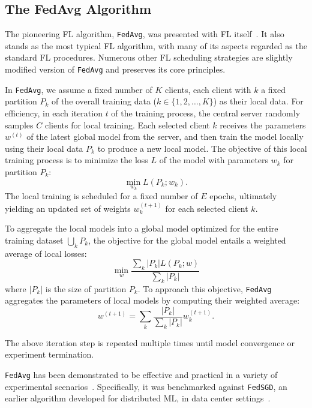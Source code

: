 \documentclass[conference]{IEEEtran}
\begin{document}
\subsection{The FedAvg Algorithm}

\newcommand{\FedAvg}{\texttt{FedAvg}}

The pioneering FL algorithm, \FedAvg{},
was presented with FL itself~\cite{mcmahan2017communication}.
It also stands as the most typical FL algorithm,
with many of its aspects regarded as the standard FL procedures.
Numerous other FL scheduling strategies are slightly modified version of
\FedAvg{} and preserves its core principles.

In \FedAvg{},
we assume a fixed number of $K$ clients,
each client with $k$ a fixed partition $P_k$ of
the overall training data ($k \in \{1, 2, \dots, K\}$) as their local data.
For efficiency,
in each iteration $t$ of the training process,
the central server randomly samples $C$ clients for local training.
Each selected client $k$ receives the parameters $w^{(t)}$ of
the latest global model from the server,
and then train the model locally using their local data $P_k$
to produce a new local model.
The objective of this local training process is to minimize the loss $L$ of
the model with parameters $w_k$ for partition $P_k$:
\begin{equation}
    \min_{w_k} L(P_k;w_k).
\end{equation}
The local training is scheduled for a fixed number of $E$ epochs,
ultimately yielding an updated set of weights $w_k^{(t+1)}$ for
each selected client $k$.

To aggregate the local models into a global model
optimized for the entire training dataset $\bigcup_k P_k$,
the objective for the global model entails
a weighted average of local losses:
\begin{equation}
    \min_{w} \frac{\sum_k |P_k|L(P_k;w)}{\sum_k |P_k|}
\end{equation}
where $|P_k|$ is the size of partition $P_k$.
To approach this objective,
\FedAvg{} aggregates the parameters of local models by
computing their weighted average:
\begin{equation}
    w^{(t+1)}=\sum_k \frac{|P_k|}{\sum_k |P_k|}w_k^{(t+1)}.
\end{equation}

The above iteration step is repeated multiple times until
model convergence or experiment termination.

\FedAvg{} has been demonstrated to be effective and practical
in a variety of experimental scenarios~\cite{mcmahan2017communication}.
Specifically, it was benchmarked against \verb|FedSGD|\cite{chen2016revisiting},
an earlier algorithm developed for distributed ML,
in data center settings~\cite{bonawitz2019towards}.
\end{document}
